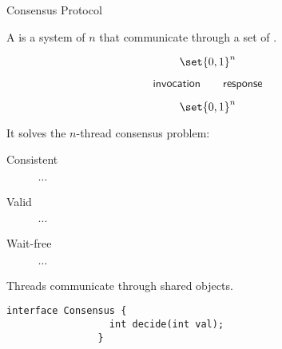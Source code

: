 \begin{frame}{}
  \centerline{\LARGE Consensus Protocol}

  \vspace{0.50cm}
\end{frame}

\begin{frame}{}
  \begin{definition}
    A  is a system of $n$ 
    that communicate through a set of .

    \begin{description}[Communicate]
      \item[Propose]
	\[
	  \set{0,1}^{n}
	\]
      \item[Communicate] 
	\[
	  \textsf{invocation} \qquad \textsf{response}
	\]
      \item[Decide] 
	\[
	  \set{0,1}^{n}
	\]
    \end{description}

    \pause
    \vspace{0.30cm}
    It  solves the $n$-thread consensus problem:
    \begin{description}
      \item[Consistent] $\cdots$
      \item[Valid] $\cdots$
      \item[Wait-free] $\cdots$
    \end{description}
  \end{definition}
\end{frame}

\begin{frame}{}

  \centerline{\Large Threads communicate through shared objects.}
\end{frame}

\begin{frame}[fragile]{}

  \begin{lstlisting}[style = CStyle]
                interface Consensus {
                  int decide(int val);
                }
  \end{lstlisting}
\end{frame}

